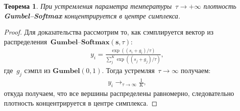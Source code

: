 \documentclass[12pt, twoside]{article}
\newtheorem{theorem}{Теорема}
\begin{document}
\begin{theorem}
При устремления параметра температуры~$\tau\to+\infty$ плотность \textbf{Gumbel--Softmax} концентрируется в центре симплекса.
\end{theorem}

\begin{proof}
Для доказательства рассмотрим то, как сэмплируется вектор из распределения~$\textbf{Gumbel--Softmax}\left(\textbf{s}, \tau\right)$:
\begin{equation*}
\begin{aligned}
y_i = \frac{\exp\left(\left(s_i+g_i\right)/ \tau\right)}{\sum_{j}^{K} \exp\left(\left(s_j+g_j\right)/ \tau\right)},
\end{aligned}
\end{equation*}
где~$g_j$ сэмпл из $\textbf{Gumbel}\left(0, 1\right)$.
Тогда устремляя~$\tau\to \infty$ получаем:
\begin{equation*}
\begin{aligned}
y_i \to_{\tau\to\infty} \frac{1}{K},
\end{aligned}
\end{equation*}
откуда получаем, что все вершины распределены равномерно, следовательно плотность концентрируется в центре симплекса.
\end{proof}
\end{document}
